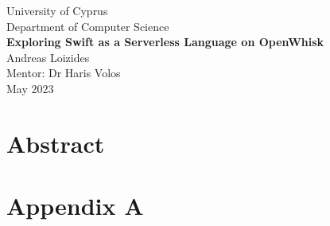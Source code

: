 \documentclass[a4paper,12pt,openright,twoside]{report}
\begin{document}
\begin{titlepage}
    \centering
    \vspace*{1in}
    \large University of Cyprus \\
    Department of Computer Science \\
    \vspace*{2in}
    \LARGE \textbf{Exploring Swift as a Serverless Language on OpenWhisk} \\
    \vspace*{1in}
    \large Andreas Loizides \\
    \vspace*{0.5in}
    \large Mentor: Dr Haris Volos \\
    \vfill
    \large May 2023 \\
\end{titlepage}

\newpage


\newpage
\chapter*{Abstract}
\lipsum[1] %

\newpage
\tableofcontents













\newpage
{}
%


\newpage
\appendix
\chapter{Appendix A}
\lipsum[1-2] %
\end{document}

